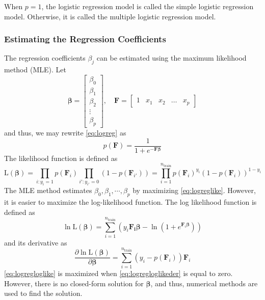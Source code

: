 \documentclass[conf]{new-aiaa}
\begin{document}
When $p = 1$, the logistic regression model is called the simple logistic regression model. Otherwise, it is called the multiple logistic regression model.

\subsubsection{Estimating the Regression Coefficients}
The regression coefficients $\beta_j$ can be estimated using the maximum likelihood method (MLE). Let 
\begin{equation}
    \boldsymbol{\beta} =
    \begin{bmatrix}
        \beta_0 \\ \beta_1 \\ \beta_2 \\ \vdots \\ \beta_p
    \end{bmatrix}, \quad
    \mathbf{F} = 
    \begin{bmatrix}
        1 & x_1 & x_2 & \dots & x_p
    \end{bmatrix}
\end{equation}
and thus, we may rewrite \eqref{eq:logreg} as
\begin{equation} \label{eq:logregmat}
    p\left(\mathbf{F}\right) = \frac{1}{1 + e^{-\mathbf{F}\boldsymbol{\beta}}}
\end{equation}
The likelihood function is defined as
\begin{equation} \label{eq:logreglike}
    \textrm{L}\left(\boldsymbol{\beta}\right) = \prod_{i:y_i=1} p\left(\mathbf{F}_i\right) \prod_{i':y_{i'}=0} \left(1 - p\left(\mathbf{F}_{i'}\right)\right) = \prod_{i=1}^{n_{\textrm{train}}} p\left(\mathbf{F}_i\right)^{y_i} \left(1 - p\left(\mathbf{F}_i\right)\right)^{1-y_i}
\end{equation}
The MLE method estimates $\beta_0, \beta_1, \cdots, \beta_p$ by maximizing \eqref{eq:logreglike}. However, it is easier to maximize the log-likelihood function. The log likelihood function is defined as
\begin{equation} \label{eq:logregloglike}
    \ln \textrm{L} \left(\boldsymbol{\beta}\right) = \sum_{i=1}^{n_{\textrm{train}}} \left(y_i \mathbf{F_i}\boldsymbol{\beta} - \ln \left(1 + e^{\mathbf{F}_i\boldsymbol{\beta}}\right) \right)
\end{equation}
and its derivative as
\begin{equation} \label{eq:logregloglikeder}
    \frac{\partial \ln \textrm{L} \left(\boldsymbol{\beta}\right)}{\partial \boldsymbol{\beta}} = \sum_{i=1}^{n_{\textrm{train}}} \left(y_i - p\left(\mathbf{F}_i\right)\right) \mathbf{F}_i
\end{equation}
\eqref{eq:logregloglike} is maximized when \eqref{eq:logregloglikeder} is equal to zero. However, there is no closed-form solution for $\boldsymbol{\beta}$, and thus, numerical methods are used to find the solution. 
\end{document}
